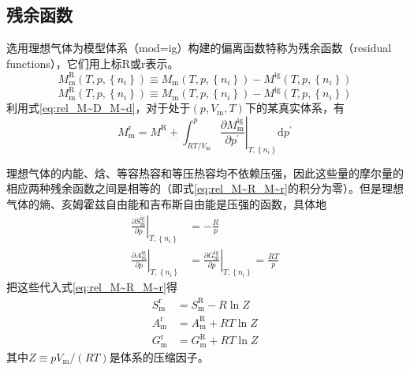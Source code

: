\documentclass[main.tex]{subfiles}
\begin{document}
\subsection{残余函数}
选用理想气体为模型体系（mod=ig）构建的偏离函数特称为残余函数（residual functions），它们用上标R或r表示。
\begin{equation}\label{eq:def_residual_function_R}
    M^\text{R}_\text{m}\left(T,p,\left\{n_i\right\}\right)\equiv M_\text{m}\left(T,p,\left\{n_i\right\}\right)-M^\text{ig}\left(T,p,\left\{n_i\right\}\right)
\end{equation}
\begin{equation}\label{eq:def_residual_function_r}
    M^\text{R}_\text{m}\left(T,p,\left\{n_i\right\}\right)\equiv M_\text{m}\left(T,p,\left\{n_i\right\}\right)-M^\text{ig}\left(T,p,\left\{n_i\right\}\right)
\end{equation}
利用式\eqref{eq:rel_M~D_M~d}，对于处于$\left(p,V_\text{m},T\right)$下的某真实体系，有
\begin{equation}
    \label{eq:rel_M~R_M~r}
    M^\text{r}_\text{m}=M^\text{R}+\int_{RT/V_\text{m}}^p\left.\frac{\partial M^\text{ig}_\text{m}}{\partial p^\prime}\right|_{T,\left\{n_i\right\}}\mathrm{d}p^\prime
\end{equation}

理想气体的内能、焓、等容热容和等压热容均不依赖压强，因此这些量的摩尔量的相应两种残余函数之间是相等的（即式\eqref{eq:rel_M~R_M~r}的积分为零）。但是理想气体的熵、亥姆霍兹自由能和吉布斯自由能是压强的函数，具体地
\begin{align*}
    \left.\frac{\partial S^\text{ig}_\text{m}}{\partial p}\right|_{T,\left\{n_i\right\}} & =-\frac{R}{p}                                                                                      \\
    \left.\frac{\partial A^\text{ig}_\text{m}}{\partial p}\right|_{T,\left\{n_i\right\}} & =\left.\frac{\partial G^\text{ig}_\text{m}}{\partial p}\right|_{T,\left\{n_i\right\}}=\frac{RT}{p}
\end{align*}
把这些代入式\eqref{eq:rel_M~R_M~r}得
\begin{align}
    S^\text{r}_\text{m} & =S^\text{R}_\text{m}-R\ln Z  \\
    A^\text{r}_\text{m} & =A^\text{R}_\text{m}+RT\ln Z \\
    G^\text{r}_\text{m} & =G^\text{R}_\text{m}+RT\ln Z
\end{align}
其中$Z\equiv pV_\text{m}/\left(RT\right)$是体系的压缩因子。
\end{document}
